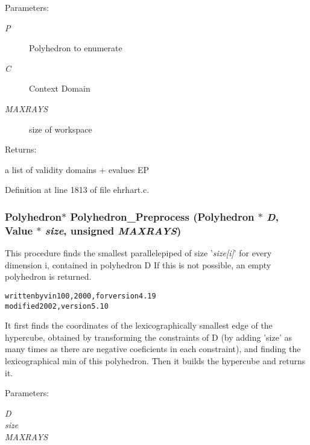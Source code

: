 \begin{Desc}
\item[Parameters: ]\par
\begin{description}
\item[{\em 
P}]Polyhedron to enumerate \item[{\em 
C}]Context Domain \item[{\em 
MAXRAYS}]size of workspace \end{description}
\end{Desc}
\begin{Desc}
\item[Returns: ]\par
a list of validity domains + evalues EP \end{Desc}


Definition at line 1813 of file ehrhart.c.
\subsubsection{\setlength{\rightskip}{0pt plus 5cm}Polyhedron$\ast$ Polyhedron\_\-Preprocess (Polyhedron $\ast$ {\em D}, Value $\ast$ {\em size}, unsigned {\em MAXRAYS})}\label{ehrhart_8c_a20}


This procedure finds the smallest parallelepiped of size '{\em size[i]}' for every dimension i, contained in polyhedron D If this is not possible, an empty polyhedron is returned.





\small\begin{alltt}
written by vin100, 2000, for version 4.19
modified 2002, version 5.10
\end{alltt}\normalsize 






It first finds the coordinates of the lexicographically smallest edge of the hypercube, obtained by transforming the constraints of D (by adding 'size' as many times as there are negative coeficients in each constraint), and finding the lexicographical min of this polyhedron. Then it builds the hypercube and returns it.



 \begin{Desc}
\item[Parameters: ]\par
\begin{description}
\item[{\em 
D}]\item[{\em 
size}]\item[{\em 
MAXRAYS}]\end{description}
\end{Desc}


